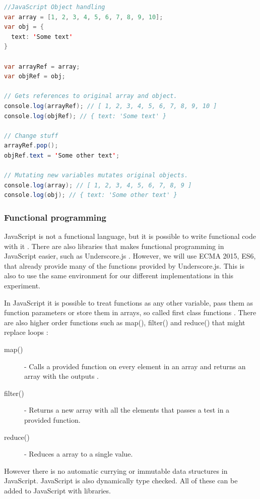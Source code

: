 \documentclass {article}
\begin{document}
\begin{lstlisting}[language=Java, breaklines=true]
//JavaScript Object handling
var array = [1, 2, 3, 4, 5, 6, 7, 8, 9, 10];
var obj = {
  text: 'Some text'
}

var arrayRef = array;
var objRef = obj;

// Gets references to original array and object.
console.log(arrayRef); // [ 1, 2, 3, 4, 5, 6, 7, 8, 9, 10 ]
console.log(objRef); // { text: 'Some text' }

// Change stuff
arrayRef.pop();
objRef.text = 'Some other text';

// Mutating new variables mutates original objects.
console.log(array); // [ 1, 2, 3, 4, 5, 6, 7, 8, 9 ]
console.log(obj); // { text: 'Some other text' }
\end{lstlisting}
\subsubsection{Functional programming}
\label{sec:js-fp}
JavaScript is not a functional language, but it is possible to write functional code with it \cite{drboolean}. There are also libraries that makes functional programming in JavaScript easier, such as Underscore.js \cite{underscore, fogus}. However, we will use ECMA 2015, ES6, that already provide many of the functions provided by Underscore.js. This is also to use the same environment for our different implementations in this experiment.

In JavaScript it is possible to treat functions as any other variable, pass them as function parameters or store them in arrays, so called first class functions \cite{drboolean}. There are also higher order functions such as map(), filter() and reduce() that might replace loops \cite{grady}:

\begin{description}
\item [map()] - Calls a provided function on every element in an array and returns an array with the outputs \cite{jsref}.
\item [filter()] - Returns a new array with all the elements that passes a test in a provided function. 
\item [reduce()] - Reduces a array to a single value.
\end{description}

However there is no automatic currying or immutable data structures in JavaScript. JavaScript is also dynamically type checked. All of these can be added to JavaScript with libraries.
\end{document}
